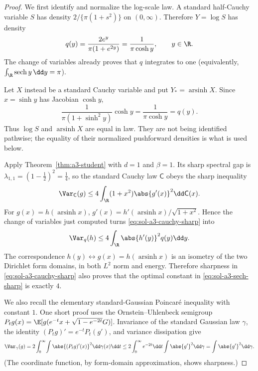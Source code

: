 \documentclass[../main.tex]{subfiles}
\begin{document}
\begin{proof}
We first identify and normalize the log-scale law.  A standard half-Cauchy variable $S$ has
density $2/\{\pi(1+s^2)\}$ on $(0,\infty)$.  Therefore $Y=\log S$ has density
\begin{equation}
\label{eq:sol-a3-log-half-cauchy}
 q(y)=\frac{2e^y}{\pi(1+e^{2y})}
     =\frac1{\pi\cosh y},\qquad y\in\R.
\end{equation}
The change of variables already proves that $q$ integrates to one (equivalently,
$\int_\R\operatorname{sech}y\,\dd y=\pi$).

Let $X$ instead be a standard Cauchy variable and put $Y_*=\operatorname{arsinh}X$.
Since $x=\sinh y$ has Jacobian $\cosh y$,
\[
 \frac1{\pi(1+\sinh^2y)}\cosh y
 =\frac1{\pi\cosh y}=q(y).
\]
Thus $\log S$ and $\operatorname{arsinh}X$ are equal in law.  They are not being identified
pathwise; the equality of their normalized pushforward densities is what is used below.

Apply Theorem~\ref{thm:a3-student} with $d=1$ and $\beta=1$.  Its sharp spectral gap is
$\lambda_{1,1}=(1-\tfrac12)^2=\tfrac14$, so the standard Cauchy law $\mathsf C$ obeys the sharp
inequality
\begin{equation}
\label{eq:sol-a3-cauchy-sharp}
 \Var_{\mathsf C}(g)
 \le4\int_\R(1+x^2)\abs{g'(x)}^2\dd\mathsf C(x).
\end{equation}
For $g(x)=h(\operatorname{arsinh}x)$,
$g'(x)=h'(\operatorname{arsinh}x)/\sqrt{1+x^2}$.  Hence the change of variables just computed
turns \eqref{eq:sol-a3-cauchy-sharp} into
\begin{equation}
\label{eq:sol-a3-sech-sharp}
 \Var_q(h)\le4\int_\R\abs{h'(y)}^2q(y)\dd y.
\end{equation}
The correspondence $h(y)\leftrightarrow g(x)=h(\operatorname{arsinh}x)$ is an isometry of the
two Dirichlet form domains, in both $L^2$ norm and energy.  Therefore sharpness in
\eqref{eq:sol-a3-cauchy-sharp} also proves that the optimal constant in
\eqref{eq:sol-a3-sech-sharp} is exactly $4$.

We also recall the elementary standard-Gaussian Poincar\'e inequality with constant $1$.
One short proof uses the Ornstein--Uhlenbeck semigroup
$P_tg(x)=\E[g(e^{-t}x+\sqrt{1-e^{-2t}}G)]$.  Invariance of the standard Gaussian law $\gamma$,
the identity $(P_tg)'=e^{-t}P_t(g')$, and variance dissipation give
\[
 \Var_\gamma(g)
 =2\int_0^\infty\!\int\abs{(P_tg)'(x)}^2\dd\gamma(x)\dd t
 \le2\int_0^\infty e^{-2t}\dd t\int\abs{g'}^2\dd\gamma
 =\int\abs{g'}^2\dd\gamma.
\]
(The coordinate function, by form-domain approximation, shows sharpness.)


\end{proof}
\end{document}
